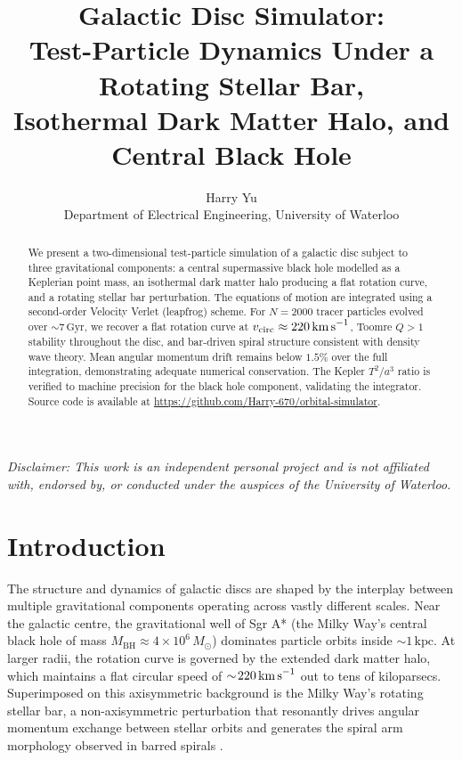 \documentclass[12pt, letterpaper]{article}
\title{%
    \textbf{Galactic Disc Simulator:}\\
    \large Test-Particle Dynamics Under a Rotating Stellar Bar,\\
    Isothermal Dark Matter Halo, and Central Black Hole
}
\author{Harry Yu\\
    \small Department of Electrical Engineering, University of Waterloo\\
}
\date{}
\begin{document}
\maketitle
\thispagestyle{fancy}

\begin{abstract}
We present a two-dimensional test-particle simulation of a galactic disc subject to three gravitational components: a central supermassive black hole modelled as a Keplerian point mass, an isothermal dark matter halo producing a flat rotation curve, and a rotating stellar bar perturbation. The equations of motion are integrated using a second-order Velocity Verlet (leapfrog) scheme. For $N = 2000$ tracer particles evolved over $\sim\!7\,\text{Gyr}$, we recover a flat rotation curve at $v_\text{circ} \approx 220\,\text{km\,s}^{-1}$, Toomre $Q > 1$ stability throughout the disc, and bar-driven spiral structure consistent with density wave theory. Mean angular momentum drift remains below $1.5\%$ over the full integration, demonstrating adequate numerical conservation. The Kepler $T^2/a^3$ ratio is verified to machine precision for the black hole component, validating the integrator. Source code is available at \url{https://github.com/Harry-670/orbital-simulator}.
\end{abstract}

\vspace{0.5em}
\noindent\small\textit{Disclaimer: This work is an independent personal project and is not affiliated with, endorsed by, or conducted under the auspices of the University of Waterloo.}

\section{Introduction}
\label{sec:intro}

The structure and dynamics of galactic discs are shaped by the interplay between multiple gravitational components operating across vastly different scales. Near the galactic centre, the gravitational well of Sgr A* (the Milky Way's central black hole of mass $M_\text{BH} \approx 4 \times 10^6\,M_\odot$) dominates particle orbits inside $\sim\!1\,\text{kpc}$. At larger radii, the rotation curve is governed by the extended dark matter halo, which maintains a flat circular speed of $\sim\!220\,\text{km\,s}^{-1}$ out to tens of kiloparsecs. Superimposed on this axisymmetric background is the Milky Way's rotating stellar bar, a non-axisymmetric perturbation that resonantly drives angular momentum exchange between stellar orbits and generates the spiral arm morphology observed in barred spirals \citep{BinneyTremaine2008}.
\end{document}
